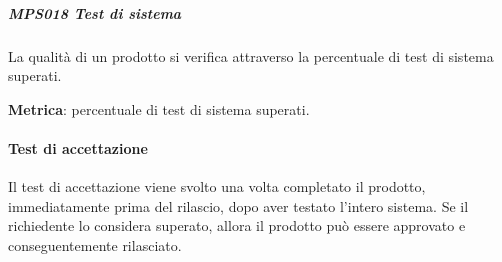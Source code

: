    \subparagraph{MPS018 Test di sistema}\label{testsistema:met}
    La qualità di un prodotto si verifica attraverso la percentuale di test di sistema superati.
    
    \textbf{Metrica}: percentuale di test di sistema superati.
    
    
    \paragraph{Test di accettazione} \label{testaccettazione}
    Il test di accettazione viene svolto una volta completato il prodotto, immediatamente prima del rilascio, dopo aver testato l'intero sistema.
    Se il richiedente lo considera superato, allora il prodotto può essere approvato e conseguentemente rilasciato.
